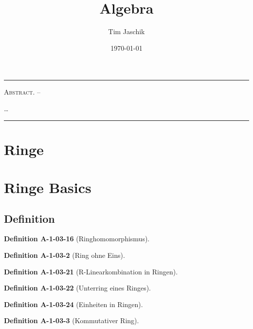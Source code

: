 \documentclass[10pt, letterpaper]{article}
\title{Algebra}
\author{Tim Jaschik}
\date{\today}
\renewenvironment{abstract}
  {
    \begin{adjustwidth}{1.5cm}{1.5cm}
    \small
    \textsc{Abstract. –}%
  }
  {
    \end{adjustwidth}
  }
\newcommand{\CustomHeading}[3]{%
  \par\medskip\noindent%
  \textbf{#1 #2} \textnormal{(#3)}.\enskip%
}
\newenvironment{DEF}[2]{\CustomHeading{Definition}{#1}{#2}}{}
\begin{document}
\maketitle
\rule{\textwidth}{0.5pt}
\begin{abstract}
…
\end{abstract}
\rule{\textwidth}{0.5pt}
\vspace{0.5cm}

\tableofcontents

\pagebreak






\section{Ringe}




\section{Ringe Basics}

\subsection{Definition}

\begin{DEF}{A-1-03-16}{Ringhomomorphismus}

\end{DEF}

\begin{DEF}{A-1-03-2}{Ring ohne Eins}

\end{DEF}

\begin{DEF}{A-1-03-21}{R-Linearkombination in Ringen}

\end{DEF}

\begin{DEF}{A-1-03-22}{Unterring eines Ringes}

\end{DEF}

\begin{DEF}{A-1-03-24}{Einheiten in Ringen}

\end{DEF}

\begin{DEF}{A-1-03-3}{Kommutativer Ring}

\end{DEF}
\end{document}
